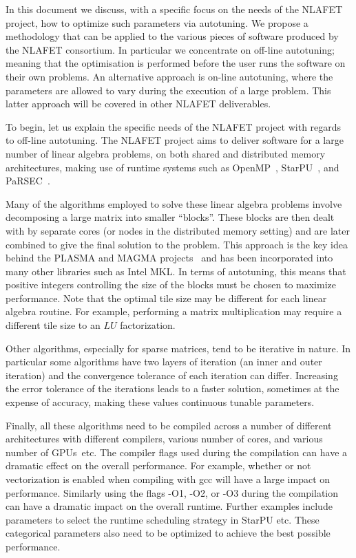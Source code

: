 \documentclass[a4paper,12pt]{article}
\begin{document}
In this document we discuss, with a specific focus on the needs of the
NLAFET project, how to optimize such parameters via autotuning.
We propose a methodology that can be applied to
the various pieces of software produced by the NLAFET consortium.
In particular we concentrate on off-line autotuning; meaning that the
optimisation is performed before the user runs the software on
their own problems.  An alternative approach is on-line autotuning,
where the parameters are allowed to vary during the execution of a
large problem.  This latter approach will be covered in other NLAFET
deliverables.

To begin, let us explain the specific needs of the NLAFET project with
regards to off-line autotuning.  The NLAFET project aims to deliver
software for a large number of linear algebra problems, on both shared
and distributed memory architectures, making use of runtime systems
such as OpenMP~\cite{ayguade2009design},
StarPU~\cite{AugThiNamWac11CCPE}, and PaRSEC~\cite{bosilca2013parsec}.

Many of the algorithms employed to solve these linear algebra problems
involve decomposing a large matrix into smaller ``blocks''.  These
blocks are then dealt with by separate cores (or nodes in the
distributed memory setting) and are later combined to give the final
solution to the problem.  This approach is the key idea behind the
PLASMA and MAGMA projects~\cite{addh09} and has been incorporated into
many other libraries such as Intel MKL.  In terms of autotuning, this
means that positive integers controlling the size of the blocks must
be chosen to maximize performance.  Note that the optimal tile size
may be different for each linear algebra routine.  For example,
performing a matrix multiplication may require a different tile size
to an $LU$ factorization.

Other algorithms,
especially for sparse matrices,
tend to be iterative in nature.
In particular some algorithms have two layers of iteration
(an inner and outer iteration)
and the convergence tolerance of each iteration can differ.
Increasing the error tolerance of the iterations
leads to a faster solution,
sometimes at the expense of accuracy,
making these values continuous tunable parameters.

Finally,
all these algorithms need to be compiled across a number of different
architectures with
different compilers, various number of cores, and various number of GPUs~etc.
The compiler flags used during the compilation can have a dramatic
effect on the overall performance.
For example,
whether or not vectorization is enabled when compiling with gcc will
have a large impact on performance.
Similarly using the flags -O1, -O2, or -O3 during the compilation can have a
dramatic impact on the overall runtime.
Further examples include parameters to select the runtime scheduling
strategy in StarPU etc.
These categorical parameters also need to be optimized to
achieve the best possible performance.
\end{document}
